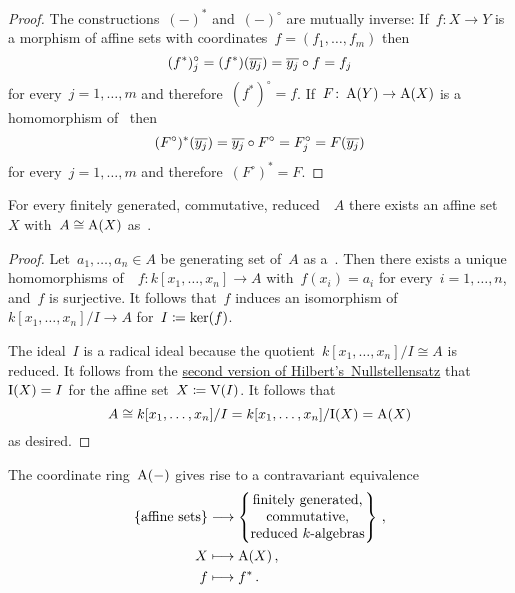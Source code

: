 \begin{proof}
  The constructions~$(-)^*$ and~$(-)^\circ$ are mutually inverse:
  If~$f \colon X \to Y$ is a morphism of affine sets with coordinates~$f = (f_1, \dotsc, f_m)$ then
  \[
      (f^*)^\circ_j
    = (f^*)(\overline{y_j})
    = \overline{y_j} \circ f
    = f_j
  \]
  for every~$j = 1, \dotsc, m$ and therefore~$(f^*)^\circ = f$.
  If~$F \colon \operatorname{A}(Y) \to \operatorname{A}(X)$ is a homomorphism of~ then
  \[
      (F^\circ)^*(\overline{y_j})
    = \overline{y_j} \circ F^\circ
    = F^\circ_j
    = F(\overline{y_j})
  \]
  for every~$j = 1, \dotsc, m$ and therefore~$(F^\circ)^* = F$.
\end{proof}


\begin{lemma}
  \label{coordinate ring is dense}
  For every finitely generated, commutative, reduced~~$A$ there exists an affine set~$X$ with~$A \cong \operatorname{A}(X)$ as~.
\end{lemma}


\begin{proof}
  Let~$a_1, \dotsc, a_n \in A$ be generating set of~$A$ as a~.
  Then there exists a unique homomorphisms of~~$f \colon k[x_1, \dotsc, x_n] \to A$ with~$f(x_i) = a_i$ for every~$i = 1, \dotsc, n$, and~$f$ is surjective.
  It follows that~$f$ induces an isomorphism of~~$k[x_1, \dotsc, x_n]/I \to A$ for~$I \coloneqq \ker(f)$.
  
  The ideal~$I$ is a radical ideal because the quotient~$k[x_1, \dotsc, x_n]/I \cong A$ is reduced.
  It follows from the \hyperref[nullstellensatz 3]{second version of Hilbert’s~Nullstellensatz} that~$\operatorname{I}(X) = I$ for the affine set~$X \coloneqq \operatorname{V}(I)$.
  It follows that
  \[
          A
    \cong k[x_1, \dots, x_n]/I
    =     k[x_1, \dots, x_n]/{\operatorname{I}(X)}
    =     \operatorname{A}(X)
  \]
  as desired.
\end{proof}


\begin{corollary}
\label{equivalence for affine sets}
  The coordinate ring~$\operatorname{A}(-)$ gives rise to a contravariant equivalence
  \begin{align*}
    \{
      \text{affine sets}
    \}
    &\longto
    \left\{
      \begin{tabular}{@{}c@{}}
        finitely generated, \\
        commutative,        \\
        reduced~\dash{$k$}{algebras}
      \end{tabular}
    \right\} \,,
    \\
    X
    &\longmapsto
    \coord(X) \,,
    \\
    f
    &\longmapsto
    f^* \,.
  \end{align*}
\end{corollary}



